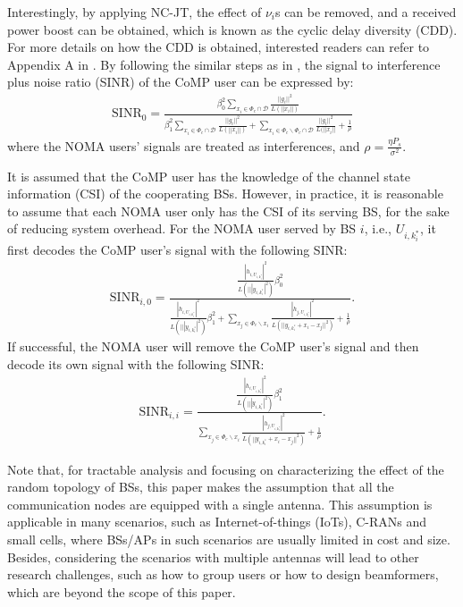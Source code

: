 \documentclass[10pt, doublecolumn]{IEEEtran}
\begin{document}
{Interestingly, by applying NC-JT, the effect of $\nu_i$s can be removed, and a received power boost can be obtained, which is known as the cyclic delay diversity (CDD). For more details on how the CDD is obtained, interested readers can refer to Appendix A in \cite{tanbourgi2014tractable}. By following the similar steps as  in \cite{tanbourgi2014tractable}, the signal to interference plus noise ratio (SINR) of the CoMP user can be expressed by:
\begin{align}
  \text{SINR}_0\!=\!\frac{\beta^2_0\sum\limits_{x_i\in \Phi _c\cap \mathcal{D}}\frac{||g_i||^2}{L(||x_i||)}}
                {\beta_1^2\sum\limits_{x_i\in \Phi _c\cap \mathcal{D}}\frac{||g_i||^2}{L(||x_i||)}\!+\!
                \sum\limits_{x_i\in \Phi _c\backslash \Phi _c\cap \mathcal{D}}\frac{||g_i||^2}{L(||x_i||}
                \!+\!\frac{1}{\rho}}
\end{align}
where the NOMA users' signals are treated as interferences, and $\rho=\frac{\eta P_s}{\sigma^2}$.}

It is assumed that the CoMP user has the knowledge of the channel state information (CSI) of the cooperating BSs. However, in practice, it is reasonable to assume that each NOMA user only has the CSI of its serving BS, for the sake of reducing system overhead. For the NOMA user served by BS $i$, i.e., $U_{i,k_i^*}$, it first decodes the CoMP user's signal with  the following SINR:
\begin{align}\label{SINRi0}
  \text{SINR}_{i,0}\!=\!\frac{\frac{|h_{i,U_{i,k_i^*}}|^2}{L(|||y_{i,k_i^*}|^2)}\beta_0^2}
                         {\frac{|h_{i,U_{i,k_i^*}}|^2}{L(|||y_{i,k_i^*}|^2)}\beta_1^2+\!\!\!\!\!\!\!
                         \sum\limits_{x_j \in \Phi_c\backslash x_i}\frac{|h_{j,U_{i,k_i^*}}|^2}{L(||y_{i,k_i^*}+x_i-x_j||^2)}\!+\!\frac{1}{\rho}}.
\end{align}
If successful, the NOMA user will remove the CoMP user's signal and then decode its own signal with the following SINR:
\begin{align}\label{SINRiii}
  \text{SINR}_{i,i}=\frac{\frac{|h_{i,U_{i,k_i^*}}|^2}{L(|||y_{i,k_i^*}|^2)}\beta_1^2}
  {
  \sum\limits_{x_j \in \Phi_c\backslash x_i}\frac{|h_{j,U_{i,k_i^*}}|^2}{L(||y_{i,k_i^*}+x_i-x_j||^2)}+\frac{1}{\rho}}.
\end{align}

{\color{black}Note that, for tractable analysis and focusing on characterizing the effect of the random topology of BSs, this paper makes the assumption that all the communication nodes are equipped with a single antenna. This assumption is applicable in many scenarios, such as Internet-of-things (IoTs), C-RANs and small cells, where BSs/APs in such scenarios are usually limited in cost and size. Besides, considering the scenarios with multiple antennas will lead to other research challenges, such as how to group
users or how to design beamformers, which are beyond the scope of this paper\cite{sys2022QD}.}
\end{document}
